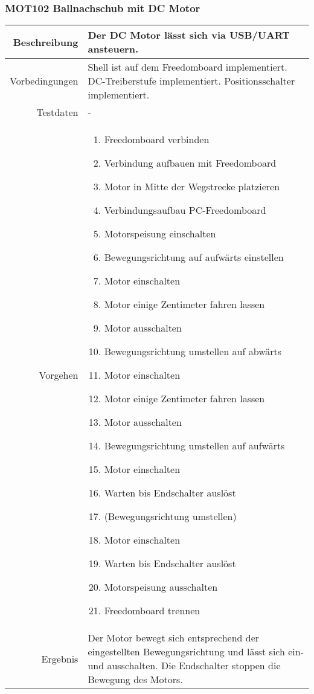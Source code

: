 \newpage
\subsubsection{MOT102 Ballnachschub mit DC Motor}
\begin{table}[h!]
	\renewcommand{\arraystretch}{1.5}
	\begin{tabular}{|r|p{14cm}|}
		\hline Beschreibung	& Der DC Motor lässt sich via USB/UART ansteuern. \\ 
		\hline Vorbedingungen	&
			Shell ist auf dem Freedomboard implementiert.
			DC-Treiberstufe implementiert. Positionsschalter implementiert. \\ 
		\hline Testdaten	& - \\ 
		\hline Vorgehen		& 
		\begin{enumerate}
			\item Freedomboard verbinden
			\item Verbindung aufbauen mit Freedomboard
			\item Motor in Mitte der Wegstrecke platzieren 
			\item Verbindungsaufbau PC-Freedomboard
			\item Motorspeisung einschalten
			\item Bewegungsrichtung auf aufwärts einstellen
			\item Motor einschalten
			\item Motor einige Zentimeter fahren lassen
			\item Motor ausschalten
			\item Bewegungsrichtung umstellen auf abwärts
			\item Motor einschalten
			\item Motor einige Zentimeter fahren lassen
			\item Motor ausschalten
			\item Bewegungsrichtung umstellen auf aufwärts
			\item Motor einschalten
			\item Warten bis Endschalter auslöst
			\item (Bewegungsrichtung umstellen)
			\item Motor einschalten
			\item Warten bis Endschalter auslöst
			\item Motorspeisung ausschalten
			\item Freedomboard trennen
		\end{enumerate} \\ 
		\hline Ergebnis 	&
			Der Motor bewegt sich entsprechend der eingestellten
			Bewegungsrichtung und lässt sich ein- und ausschalten.
			Die Endschalter stoppen die Bewegung des Motors. \\ 
		\hline 
	\end{tabular}
\end{table}

